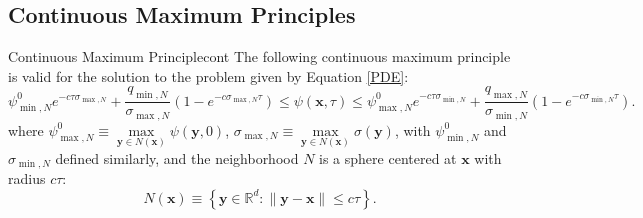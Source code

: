 \subsection{Continuous Maximum Principles}
\begin{theorem}{Continuous Maximum Principle}{cont}
   The following continuous maximum principle is valid for the solution to the
   problem given by Equation \eqref{PDE}:
   \begin{equation}
      \psi_{\min,N}^0 e^{-c\tau\sigma_{\max,N}} + 
            \frac{q_{\min,N}}{\sigma_{\max,N}}(1 - e^{-c\sigma_{\max,N}\tau})
      \le\psi(\mathbf{x},\tau)\le
      \psi_{\max,N}^0 e^{-c\tau\sigma_{\min,N}} + 
            \frac{q_{\max,N}}{\sigma_{\min,N}}(1 - e^{-c\sigma_{\min,N}\tau}).
   \end{equation}
   where $\psi_{\max,N}^0\equiv\max\limits_{\mathbf{y}\in N(\mathbf{x})}\psi(\mathbf{y},0)$,
   $\sigma_{\max,N}\equiv\max\limits_{\mathbf{y}\in N(\mathbf{x})}\sigma(\mathbf{y})$, with
   $\psi_{\min,N}^0$ and $\sigma_{\min,N}$ defined similarly, and the neighborhood $N$ is a
   sphere centered at $\mathbf{x}$ with radius $c\tau$:
   \begin{equation}
      N(\mathbf{x})\equiv\left\{\mathbf{y}\in\mathbb{R}^d : 
         \|\mathbf{y} - \mathbf{x}\| \le c\tau\right\}.
   \end{equation}
\end{theorem}

